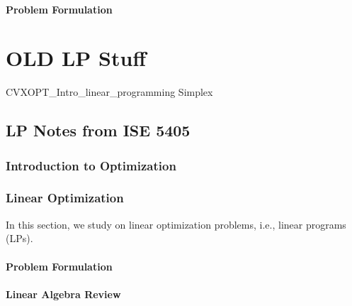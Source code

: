 \documentclass[letter,12pt]{book}
\renewcommand{\0}{\mathbf{0}}
\begin{document}
\subsection{Problem Formulation} 


\part{OLD LP Stuff}

{CVXOPT_Intro_linear_programming}
{Simplex}







%
%
%





%


\chapter{LP Notes from ISE 5405}
\section{Introduction to Optimization}


\newpage \section{Linear Optimization}
In this section, we study on linear optimization problems, i.e., linear programs (LPs).

\subsection{Problem Formulation} 


\subsection{Linear Algebra Review} 

\end{document}
